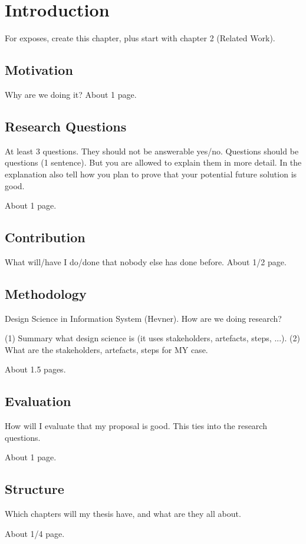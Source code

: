 \chapter{Introduction}
\label{sec:intro}

For exposes, create this chapter, plus start with chapter 2 (Related Work).

\section{Motivation}
\label{sec:intro:mo}

Why are we doing it? About 1 page.

\section{Research Questions}
\label{sec:intro:rq}

At least 3 questions. They should not be answerable yes/no. Questions should be
questions (1 sentence). But you are allowed to explain them in more detail. In
the explanation also tell how you plan to prove that your potential future
solution is good.

About 1 page.

\section{Contribution}
\label{sec:intro:con}

What will/have I do/done that nobody else has done before. About 1/2 page.

\section{Methodology}
\label{sec:intro:meth}

Design Science in Information System (Hevner). How are we doing research?

(1) Summary what design science is (it uses stakeholders, artefacts, steps,
...). (2) What are the stakeholders, artefacts, steps for MY case.

About 1.5 pages.

\section{Evaluation}
\label{sec:intro:ev}

How will I evaluate that my proposal is good. This ties into the research questions.

About 1 page.

\section{Structure}
\label{sec:intro:struct}

Which chapters will my thesis have, and what are they all about.

About 1/4 page.
